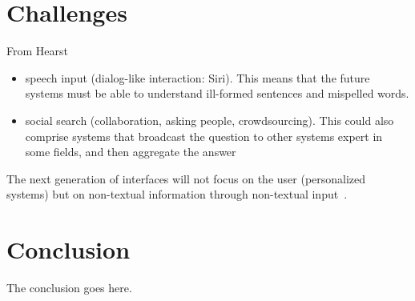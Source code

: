 \documentclass[10pt,journal,letterpaper,compsoc]{IEEEtran}
\begin{document}
\section{Challenges}
\label{sec:challenges}
From Hearst~\cite{Hearst:2011:NSU:2018396.2018414}
\begin{itemize}
  \item speech input (dialog-like interaction: Siri). This means that the future
  systems must be able to understand ill-formed sentences and mispelled words.
  \item social search (collaboration, asking people, crowdsourcing). This could
  also comprise systems that broadcast the question to other systems expert in
  some fields, and then aggregate the answer
\end{itemize}
The next generation of interfaces will not focus on the user (personalized
systems) but on non-textual information through non-textual
input~\cite{Hearst:2011:NSU:2018396.2018414}. 













\section{Conclusion}
\label{sec:conclusion}
The conclusion goes here.






%
\end{document}
